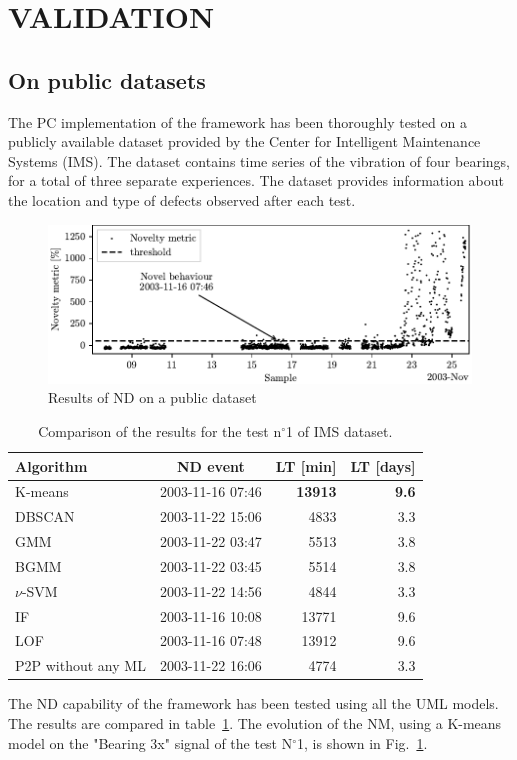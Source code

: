 \section{VALIDATION}
\label{sec:validation}

\subsection{On public datasets}

The PC implementation of the framework has been thoroughly tested on a publicly available dataset provided by the Center for Intelligent Maintenance Systems (IMS).
The dataset contains time series of the vibration of four bearings, for a total of three separate  experiences. The dataset provides information about the location and type of defects observed after each test.

\begin{figure}
    \includegraphics[width=\linewidth]{images/ND_IMS.pdf}
    \caption{Results of ND on a public dataset}
    \label{fig:ND_IMS}
\end{figure}
\begin{table}
    \centering
    \caption{Comparison of the results for the test n$^\circ$1 of IMS dataset.}
    \label{tab:ims01_comparision}
    \begin{tabular}{lcrr} 
    \toprule
    \textbf{Algorithm} & \textbf{ND event} & \textbf{LT }{[}min] & \textbf{LT }{[}days] \\ 
    \hline
    K-means & 2003-11-16 07:46 & \textbf{13913} & \textbf{9.6} \\
    DBSCAN & 2003-11-22 15:06 & 4833 & 3.3\\
    GMM & 2003-11-22 03:47 & 5513 & 3.8\\
    BGMM & 2003-11-22 03:45 & 5514 & 3.8\\
    $\nu$-SVM & 2003-11-22 14:56 & 4844 &3.3\\
    IF & 2003-11-16 10:08 & 13771 & 9.6\\
    LOF & 2003-11-16 07:48 & 13912 & 9.6\\
    {P2P} without any ML & 2003-11-22 16:06 & 4774 & 3.3\\
    \bottomrule
    \end{tabular}
\end{table}
The ND capability of the framework has been tested using all the UML models. The results are compared in table~\ref{tab:ims01_comparision}. The evolution of the NM, using a K-means model on the "Bearing 3x" signal of the test N$^\circ$1, is shown in Fig.~\ref{fig:ND_IMS}.


